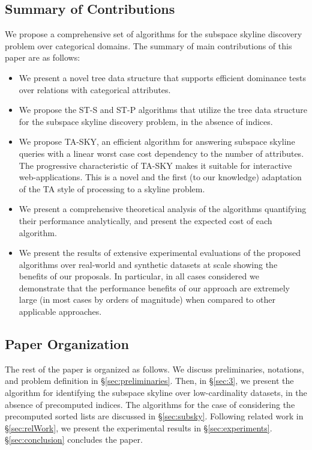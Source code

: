 \subsection{Summary of Contributions}
We propose a comprehensive set of algorithms for the subspace skyline discovery problem over categorical domains.
The summary of main contributions of this paper are as follows:
\begin{itemize}  
    \itemsep0em 
    \item We present a novel tree data structure that supports efficient dominance tests over relations with categorical attributes.
    \item We propose the ST-S and ST-P algorithms that utilize the tree data structure for the subspace skyline discovery problem, in the absence of indices.
    \item We propose TA-SKY, an efficient algorithm for answering subspace skyline queries with a linear worst case cost dependency to the number of attributes. The progressive characteristic of TA-SKY makes it suitable for interactive web-applications. This is a novel and the first (to our knowledge) adaptation of the TA style of processing to a skyline problem.
    \item We present a comprehensive theoretical analysis of the algorithms quantifying their performance analytically, and present the expected cost of each algorithm.
    \item We present the results of extensive experimental evaluations of the proposed algorithms over real-world and synthetic datasets at scale showing the benefits of our proposals. In particular, in all cases considered we demonstrate that the performance benefits of our approach are extremely large (in most cases by orders of magnitude) when compared to other applicable approaches.
\end{itemize}


\subsection{Paper Organization}
The rest of the paper is organized as follows. We discuss preliminaries, notations, and problem definition in \S\ref{sec:preliminaries}. Then, in \S\ref{sec:3}, we present the algorithm for identifying the subspace skyline over low-cardinality datasets, in the absence of precomputed indices. The algorithms for the case of considering the precomputed sorted lists are discussed in \S\ref{sec:subsky}. Following related work in \S\ref{sec:relWork}, we present the experimental results in \S\ref{sec:experiments}. \S\ref{sec:conclusion} concludes the paper.